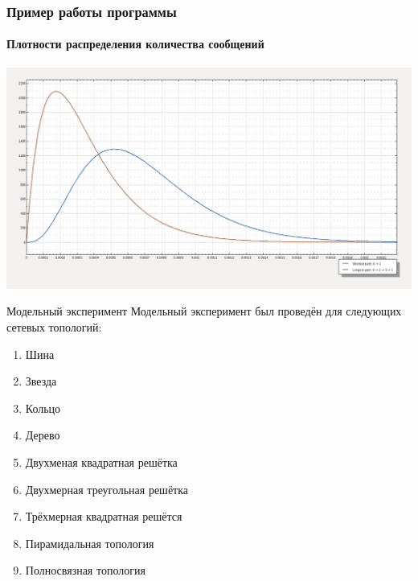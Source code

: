 \documentclass[aspectratio=43]{beamer}
\begin{document}
\begin{frame}
\frametitle{Пример работы программы}
\framesubtitle{Плотности распределения количества сообщений}

\includegraphics[width=.95\textwidth]{demo4_chart_2}
\end{frame}

\begin{frame}

\begin{block}{Модельный эксперимент}
Модельный эксперимент был проведён для следующих сетевых топологий:
\begin{enumerate}
	\item Шина	
	\item Звезда
	\item Кольцо
	\item Дерево
	\item Двухменая квадратная решётка
	\item Двухмерная треугольная решётка
	\item Трёхмерная квадратная решётся
	\item Пирамидальная топология	
	\item Полносвязная топология
\end{enumerate}
\end{block}
\end{frame}
\end{document}
